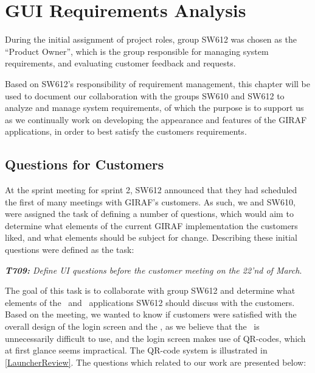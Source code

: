 \chapter{GUI Requirements Analysis}\label{sec:Colab2}
During the initial assignment of project roles, group SW612 was chosen as the
``Product Owner'', which is the group responsible for managing system
requirements, and evaluating customer feedback and requests.\nl

Based on SW612's responsibility of requirement management, this chapter will be
used to document our collaboration with the groups SW610 and SW612 to analyze
and manage system requirements, of which the purpose is to support us as we
continually work on developing the appearance and features of the GIRAF
applications, in order to best satisfy the customers requirements.\nl

\section{Questions for Customers}\label{QfC}
At the sprint meeting for sprint 2, SW612 announced that they had scheduled the
first of many meetings with GIRAF's customers. As such, we and SW610, were
assigned the task of defining a number of questions, which would aim to
determine what elements of the current GIRAF implementation the customers liked,
and what elements should be subject for change. Describing these initial
questions were defined as the task:\nl

\textit{\textbf{T709:} Define UI questions before the customer meeting on the
22'nd of March}.\nl 

The goal of this task is to collaborate with group SW612 and determine what
elements of the \lapp\ and \wapp\ applications SW612 should discuss with
the customers. Based on the meeting, we wanted to know if customers were
satisfied with the overall design of the login screen and the \wapp, as we
believe that the \wapp\ is unnecessarily difficult to use, and the
login screen makes use of QR-codes, which at first glance seems impractical. The
QR-code system is illustrated in \autoref{LauncherReview}.
The questions which related to our work are presented below:

